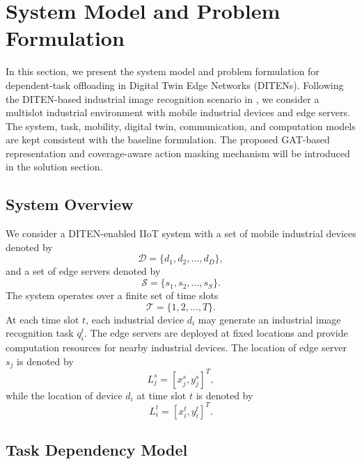 \documentclass[conference]{IEEEtran}
\begin{document}
\section{System Model and Problem Formulation}

In this section, we present the system model and problem formulation for dependent-task offloading in Digital Twin Edge Networks (DITENs). Following the DITEN-based industrial image recognition scenario in \cite{10892268}, we consider a multislot industrial environment with mobile industrial devices and edge servers. The system, task, mobility, digital twin, communication, and computation models are kept consistent with the baseline formulation. The proposed GAT-based representation and coverage-aware action masking mechanism will be introduced in the solution section.

\subsection{System Overview}

We consider a DITEN-enabled IIoT system with a set of mobile industrial devices denoted by
\begin{equation}
\mathcal{D}=\{d_1,d_2,\ldots,d_D\},
\end{equation}
and a set of edge servers denoted by
\begin{equation}
\mathcal{S}=\{s_1,s_2,\ldots,s_S\}.
\end{equation}
The system operates over a finite set of time slots
\begin{equation}
\mathcal{T}=\{1,2,\ldots,T\}.
\end{equation}
At each time slot $t$, each industrial device $d_i$ may generate an industrial image recognition task $q_i^t$. The edge servers are deployed at fixed locations and provide computation resources for nearby industrial devices. The location of edge server $s_j$ is denoted by
\begin{equation}
L_j^s=[x_j^s,y_j^s]^T,
\end{equation}
while the location of device $d_i$ at time slot $t$ is denoted by
\begin{equation}
L_i^t=[x_i^t,y_i^t]^T.
\end{equation}

\subsection{Task Dependency Model}
\end{document}
